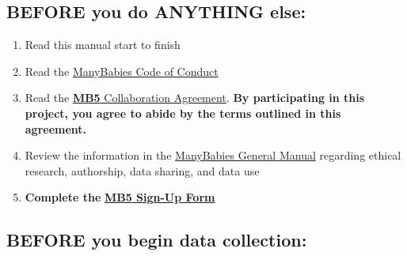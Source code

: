 \documentclass[
  letterpaper,
  DIV=11,
  numbers=noendperiod,
  oneside]{scrreprt}
\providecommand{\tightlist}{%
  \setlength{\itemsep}{0pt}\setlength{\parskip}{0pt}}
\begin{document}
\begin{tcolorbox}[enhanced jigsaw, coltitle=black, colframe=quarto-callout-important-color-frame, titlerule=0mm, colback=white, arc=.35mm, toprule=.15mm, left=2mm, colbacktitle=quarto-callout-important-color!10!white, opacityback=0, bottomtitle=1mm, title=\textcolor{quarto-callout-important-color}{\faExclamation}\hspace{0.5em}{These are the steps that every data-collecting lab must follow to
participate in \textbf{MB5}. This is just an overview of the process.
More detail for each numbered item is available in the linked sections.}, breakable, rightrule=.15mm, opacitybacktitle=0.6, toptitle=1mm, leftrule=.75mm, bottomrule=.15mm]

\end{tcolorbox}

\subsection{BEFORE you do ANYTHING
else:}\label{before-you-do-anything-else}

\begin{enumerate}
\def\labelenumi{(\arabic{enumi})}
\tightlist
\item
  Read this manual start to finish
\item
  Read the \href{https://manybabies.org/codeofconduct/}{ManyBabies Code
  of Conduct}
\item
  Read the
  \href{https://docs.google.com/document/d/1vbTDmH6euda5pJN4uyds3zsnQ1DXrW9wpHogwC-5TSk/edit?usp=sharing}{\textbf{MB5}
  Collaboration Agreement}. \textbf{By participating in this project,
  you agree to abide by the terms outlined in this agreement.}
\item
  Review the information in the
  \href{ManyBabies\%20General\%20Manual}{ManyBabies General Manual}
  regarding ethical research, authorship, data sharing, and data use
\item
  \textbf{Complete the
  }\href{https://airtable.com/appRoqMKzcK3NsXt4/pag99dsjlXiM24ZnB/form/}{\textbf{\textbf{MB5}
  Sign-Up Form}}
\end{enumerate}

\subsection{BEFORE you begin data
collection:}\label{before-you-begin-data-collection}
\end{document}
